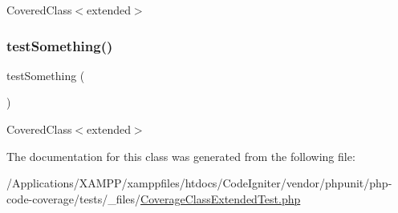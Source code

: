 Covered\+Class$<$extended$>$ \mbox{\label{class_coverage_class_extended_test_a0fc4e17369bc9607ebdd850d9eda8167}} 
\subsubsection{\texorpdfstring{test\+Something()}{testSomething()}\hspace{0.1cm}{\footnotesize\ttfamily [2/2]}}
{\footnotesize\ttfamily test\+Something (\begin{DoxyParamCaption}{ }\end{DoxyParamCaption})}

Covered\+Class$<$extended$>$ 

The documentation for this class was generated from the following file\+:\begin{DoxyCompactItemize}
\item 
/\+Applications/\+X\+A\+M\+P\+P/xamppfiles/htdocs/\+Code\+Igniter/vendor/phpunit/php-\/code-\/coverage/tests/\+\_\+files/\mbox{\hyperlink{php-code-coverage_2tests_2__files_2_coverage_class_extended_test_8php}{Coverage\+Class\+Extended\+Test.\+php}}\end{DoxyCompactItemize}
